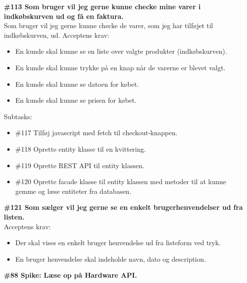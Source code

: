 \documentclass[11pt]{report}
\begin{document}
\noindent\textbf{\#113 Som bruger vil jeg gerne kunne checke mine varer i indkøbskurven ud og få en faktura.}\\
\noindent Som bruger vil jeg gerne kunne checke de varer, som jeg har tilføjet til indkøbskurven, ud.
\noindent Acceptens krav:
\begin{itemize}[topsep=0pt, partopsep=0pt]
  \item En kunde skal kunne se en liste over valgte produkter (indkøbskurven).
  \item En kunde skal kunne trykke på en knap når de varerne er blevet valgt.
  \item En kunde skal kunne se datoen for købet.
  \item En kunde skal kunne se prisen for købet.
\end{itemize}
\noindent Subtasks:
\begin{itemize}[topsep=0pt, partopsep=0pt]
  \item \#117 Tilføj javascript med fetch til checkout-knappen.
  \item \#118 Oprette entity klasse til en kvittering.
  \item \#119 Oprette REST API til entity klassen.
  \item \#120 Oprette facade klasse til entity klassen med metoder til at kunne gemme og læse entiteter fra databasen.
\end{itemize}

\noindent\textbf{\#121 Som sælger vil jeg gerne se en enkelt brugerhenvendelser ud fra listen.}\\
\noindent Acceptens krav:
\begin{itemize}[topsep=0pt, partopsep=0pt]
  \item Der skal vises en enkelt bruger henvendelse ud fra listeform ved tryk.
  \item En bruger henvendelse skal indeholde navn, dato og description.
\end{itemize}

\noindent\textbf{\#88 Spike: Læse op på Hardware API.}
\end{document}
